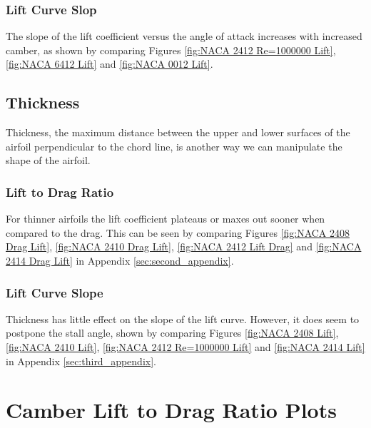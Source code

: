 \documentclass{article}
\begin{document}
\subsubsection{Lift Curve Slop}

The slope of the lift coefficient versus the angle of attack increases with increased camber, as shown by comparing Figures \ref{fig:NACA 2412 Re=1000000 Lift}, \ref{fig:NACA 6412 Lift} and \ref{fig:NACA 0012 Lift}.


\subsection{Thickness}
Thickness, the maximum distance between the upper and lower surfaces of the airfoil perpendicular to the chord line, is another way we can manipulate the shape of the airfoil.

\subsubsection{Lift to Drag Ratio}
For thinner airfoils the lift coefficient plateaus or maxes out sooner when compared to the drag. This can be seen by comparing Figures \ref{fig:NACA 2408 Drag Lift}, \ref{fig:NACA 2410 Drag Lift}, \ref{fig:NACA 2412 Lift Drag} and \ref{fig:NACA 2414 Drag Lift} in Appendix \ref{sec:second_appendix}.

\subsubsection{Lift Curve Slope}
Thickness has little effect on the slope of the lift curve. However, it does seem to postpone the stall angle, shown by comparing Figures \ref{fig:NACA 2408 Lift}, \ref{fig:NACA 2410 Lift}, \ref{fig:NACA 2412 Re=1000000 Lift} and \ref{fig:NACA 2414 Lift} in Appendix \ref{sec:third_appendix}.




\clearpage
\appendix

\section{Camber Lift to Drag Ratio Plots}
\label{sec:zero_appendix}
\end{document}
